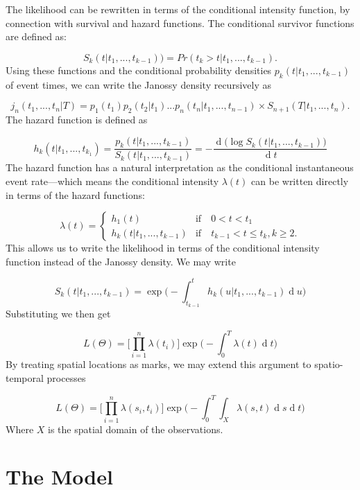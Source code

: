 \documentclass[11pt,a4paper]{article}
\renewcommand{\d}[1]{\ensuremath{\operatorname{d}\!{#1}}}
\begin{document}
The likelihood can be rewritten in terms of the conditional intensity function, by connection with survival and hazard functions. 
The conditional survivor functions are defined as:

\[
S_{k}(t | t_{1}, ... , t_{k - 1})) = Pr(t_{k} > t | t_{1}, ... , t_{k - 1}). 
\]
Using these functions and the conditional probability densities $p_{k}(t | t_{1}, ... , t_{k-1})$ of event times, we can write the Janossy density recursively as

\[
j_{n}(t_{1}, ... ,t_{n} | T) = p_{1}(t_{1})p_{2}(t_{2} | t_{1}) ...p_{n}(t_{n} | t_{1}, ..., t_{n - 1}) \times S_{n+1} (T | t_{1}, ... ,t_{n}).
\]
The hazard function is defined as

\[
h_{k}(t | t_{1}, ... , t_{k_{1}}) = \frac{p_{k}(t | t_{1}, ... , t_{k - 1})}{S_{k}(t | t_{1}, ... , t_{k - 1})} = - \frac{\d ( \log S_{k}(t | t_{1}, ... , t_{k - 1}))}{\d t}
\]
The hazard function has a natural interpretation as the conditional instantaneous event rate—which means the conditional intensity $\lambda (t)$ can be written directly in terms of the hazard functions:

\[
\lambda (t) =
\begin{cases}
h_{1}(t) & \mbox{if} \quad 0 < t < t_{1} \\
h_{k}(t | t_{1}, ..., t_{k-1}) & \mbox{if} \quad t_{k - 1} < t \leq t_{k}, k \geq 2.
\end{cases}
\]
This allows us to write the likelihood in terms of the conditional intensity function instead of the Janossy density. We may write

\[
S_{k}(t | t_{1}, ... , t_{k - 1}) = \exp \Bigg( - \int_{t_{k-1}}^{t} h_{k} (u | t_{1}, ..., t_{k-1}) \d u \Bigg)
\]
Substituting we then get

\[
L(\Theta) = \Bigg[ \prod_{i=1}^{n} \lambda(t_{i}) \Bigg] \exp \Bigg( - \int_{0}^T \lambda(t) \d t  \Bigg)
\]
By treating spatial locations as marks, we may extend this argument to spatio-temporal processes

\[
L(\Theta) = \Bigg[ \prod_{i=1}^{n} \lambda(s_{i}, t_{i}) \Bigg] \exp \Bigg( - \int_{0}^{T} \int_{X} \lambda(s, t) \d s \d t  \Bigg)
\]
Where $X$ is the spatial domain of the observations.










\section{The Model}
\end{document}

